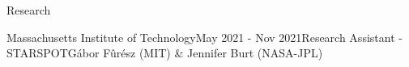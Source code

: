 \documentclass{resume} %
\begin{document}
\begin{rSection}{Research}
\begin{rSubsection}{Massachusetts Institute of Technology}{May 2021 - Nov 2021}{Research Assistant - STARSPOT}{G\'abor F\^ur\'esz (MIT) \& Jennifer Burt (NASA-JPL)}
\end{rSubsection}


\end{rSection}
\end{document}
